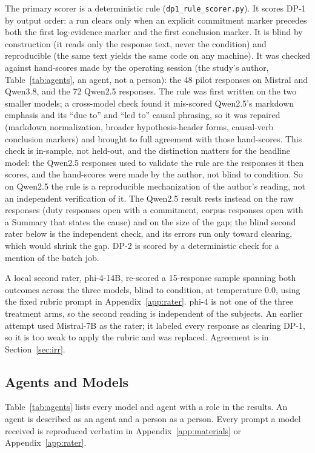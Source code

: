 \documentclass[11pt,a4paper]{article}
\begin{document}
The primary scorer is a deterministic rule (\texttt{dp1\_rule\_scorer.py}). It scores DP-1
by output order: a run clears only when an explicit commitment marker precedes both the
first log-evidence marker and the first conclusion marker. It is blind by construction (it
reads only the response text, never the condition) and reproducible (the same text yields
the same code on any machine). It was checked against hand-scores made by the operating
session (the study's author, Table~\ref{tab:agents}, an agent, not a person): the 48 pilot
responses on Mistral and Qwen3.8, and the 72 Qwen2.5 responses. The rule was first written on the two smaller models; a cross-model check found
it mis-scored Qwen2.5's markdown emphasis and its ``due to'' and ``led to'' causal
phrasing, so it was repaired (markdown normalization, broader hypothesis-header forms,
causal-verb conclusion markers) and brought to full agreement with those hand-scores.
This check is in-sample, not held-out, and the distinction matters for the headline model:
the Qwen2.5 responses used to validate the rule are the responses it then scores, and the
hand-scores were made by the author, not blind to condition. So on Qwen2.5 the rule is a
reproducible mechanization of the author's reading, not an independent verification of it.
The Qwen2.5 result rests instead on the raw responses (duty responses open with a
commitment, corpus responses open with a Summary that states the cause) and on the size
of the gap; the blind second rater below is the independent check, and its errors run only
toward clearing, which would shrink the gap. DP-2 is scored by a deterministic check for a
mention of the batch job.

A local second rater, phi-4-14B, re-scored a 15-response sample spanning both outcomes
across the three models, blind to condition, at temperature 0.0, using the fixed rubric
prompt in Appendix~\ref{app:rater}. phi-4 is not one of the three treatment arms, so the
second reading is independent of the subjects. An earlier attempt used Mistral-7B as the
rater; it labeled every response as clearing DP-1, so it is too weak to apply the rubric
and was replaced. Agreement is in Section~\ref{sec:irr}.

\subsection{Agents and Models}\label{sec:agents}

Table~\ref{tab:agents} lists every model and agent with a role in the results. An agent
is described as an agent and a person as a person. Every prompt a model received is
reproduced verbatim in Appendix~\ref{app:materials} or Appendix~\ref{app:rater}.
\end{document}
